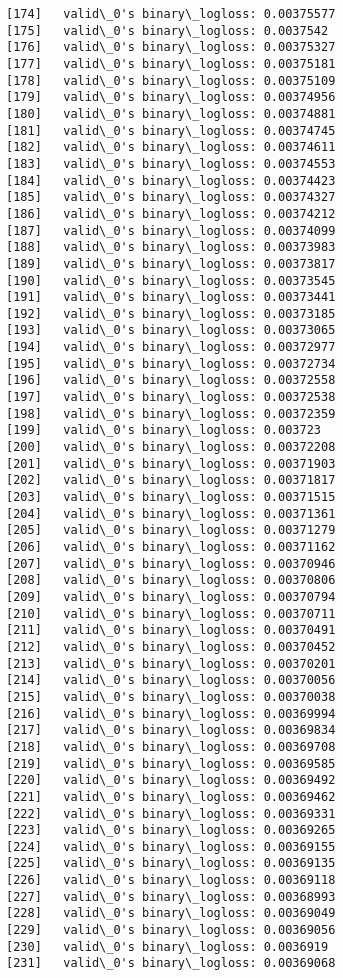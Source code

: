 \documentclass[11pt]{article}
\begin{document}
\begin{Verbatim}[commandchars=\\\{\}]
[174]	valid\_0's binary\_logloss: 0.00375577
[175]	valid\_0's binary\_logloss: 0.0037542
[176]	valid\_0's binary\_logloss: 0.00375327
[177]	valid\_0's binary\_logloss: 0.00375181
[178]	valid\_0's binary\_logloss: 0.00375109
[179]	valid\_0's binary\_logloss: 0.00374956
[180]	valid\_0's binary\_logloss: 0.00374881
[181]	valid\_0's binary\_logloss: 0.00374745
[182]	valid\_0's binary\_logloss: 0.00374611
[183]	valid\_0's binary\_logloss: 0.00374553
[184]	valid\_0's binary\_logloss: 0.00374423
[185]	valid\_0's binary\_logloss: 0.00374327
[186]	valid\_0's binary\_logloss: 0.00374212
[187]	valid\_0's binary\_logloss: 0.00374099
[188]	valid\_0's binary\_logloss: 0.00373983
[189]	valid\_0's binary\_logloss: 0.00373817
[190]	valid\_0's binary\_logloss: 0.00373545
[191]	valid\_0's binary\_logloss: 0.00373441
[192]	valid\_0's binary\_logloss: 0.00373185
[193]	valid\_0's binary\_logloss: 0.00373065
[194]	valid\_0's binary\_logloss: 0.00372977
[195]	valid\_0's binary\_logloss: 0.00372734
[196]	valid\_0's binary\_logloss: 0.00372558
[197]	valid\_0's binary\_logloss: 0.00372538
[198]	valid\_0's binary\_logloss: 0.00372359
[199]	valid\_0's binary\_logloss: 0.003723
[200]	valid\_0's binary\_logloss: 0.00372208
[201]	valid\_0's binary\_logloss: 0.00371903
[202]	valid\_0's binary\_logloss: 0.00371817
[203]	valid\_0's binary\_logloss: 0.00371515
[204]	valid\_0's binary\_logloss: 0.00371361
[205]	valid\_0's binary\_logloss: 0.00371279
[206]	valid\_0's binary\_logloss: 0.00371162
[207]	valid\_0's binary\_logloss: 0.00370946
[208]	valid\_0's binary\_logloss: 0.00370806
[209]	valid\_0's binary\_logloss: 0.00370794
[210]	valid\_0's binary\_logloss: 0.00370711
[211]	valid\_0's binary\_logloss: 0.00370491
[212]	valid\_0's binary\_logloss: 0.00370452
[213]	valid\_0's binary\_logloss: 0.00370201
[214]	valid\_0's binary\_logloss: 0.00370056
[215]	valid\_0's binary\_logloss: 0.00370038
[216]	valid\_0's binary\_logloss: 0.00369994
[217]	valid\_0's binary\_logloss: 0.00369834
[218]	valid\_0's binary\_logloss: 0.00369708
[219]	valid\_0's binary\_logloss: 0.00369585
[220]	valid\_0's binary\_logloss: 0.00369492
[221]	valid\_0's binary\_logloss: 0.00369462
[222]	valid\_0's binary\_logloss: 0.00369331
[223]	valid\_0's binary\_logloss: 0.00369265
[224]	valid\_0's binary\_logloss: 0.00369155
[225]	valid\_0's binary\_logloss: 0.00369135
[226]	valid\_0's binary\_logloss: 0.00369118
[227]	valid\_0's binary\_logloss: 0.00368993
[228]	valid\_0's binary\_logloss: 0.00369049
[229]	valid\_0's binary\_logloss: 0.00369056
[230]	valid\_0's binary\_logloss: 0.0036919
[231]	valid\_0's binary\_logloss: 0.00369068

\end{Verbatim}
\end{document}
